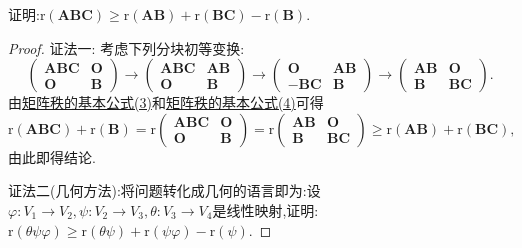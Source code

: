 \documentclass[lang=cn,newtx,10pt,scheme=chinese]{elegantbook}
\begin{document}
\begin{proposition}[Frobenius不等式]\label{proposition:Frobenius不等式}
证明:\(\mathrm{r}(\boldsymbol{A}\boldsymbol{B}\boldsymbol{C})\geq\mathrm{r}(\boldsymbol{A}\boldsymbol{B})+\mathrm{r}(\boldsymbol{B}\boldsymbol{C})-\mathrm{r}(\boldsymbol{B})\).
\end{proposition}
\begin{proof}
{\color{blue}证法一:}
考虑下列分块初等变换:
\[
\begin{pmatrix}
\boldsymbol{A}\boldsymbol{B}\boldsymbol{C}&\boldsymbol{O}\\
\boldsymbol{O}&\boldsymbol{B}
\end{pmatrix}\to
\begin{pmatrix}
\boldsymbol{A}\boldsymbol{B}\boldsymbol{C}&\boldsymbol{A}\boldsymbol{B}\\
\boldsymbol{O}&\boldsymbol{B}
\end{pmatrix}\to
\begin{pmatrix}
\boldsymbol{O}&\boldsymbol{A}\boldsymbol{B}\\
-\boldsymbol{B}\boldsymbol{C}&\boldsymbol{B}
\end{pmatrix}\to
\begin{pmatrix}
\boldsymbol{A}\boldsymbol{B}&\boldsymbol{O}\\
\boldsymbol{B}&\boldsymbol{B}\boldsymbol{C}
\end{pmatrix}.
\]
由\hyperref[矩阵秩的基本公式3]{矩阵秩的基本公式(3)}和\hyperref[矩阵秩的基本公式4]{矩阵秩的基本公式(4)}可得
\[
\mathrm{r}(\boldsymbol{A}\boldsymbol{B}\boldsymbol{C})+\mathrm{r}(\boldsymbol{B})=\mathrm{r}\begin{pmatrix}
\boldsymbol{A}\boldsymbol{B}\boldsymbol{C}&\boldsymbol{O}\\
\boldsymbol{O}&\boldsymbol{B}
\end{pmatrix}=\mathrm{r}\begin{pmatrix}
\boldsymbol{A}\boldsymbol{B}&\boldsymbol{O}\\
\boldsymbol{B}&\boldsymbol{B}\boldsymbol{C}
\end{pmatrix}\geq\mathrm{r}(\boldsymbol{A}\boldsymbol{B})+\mathrm{r}(\boldsymbol{B}\boldsymbol{C}),
\]
由此即得结论. 

{\color{blue}证法二(几何方法):}将问题转化成几何的语言即为:设\(\varphi:V_1\to V_2,\psi:V_2\to V_3,\theta:V_3\to V_4\)是线性映射,证明:\(\text{r}(\theta\psi\varphi)\geq\text{r}(\theta\psi)+\text{r}(\psi\varphi)-\text{r}(\psi)\).


\end{proof}
\end{document}
